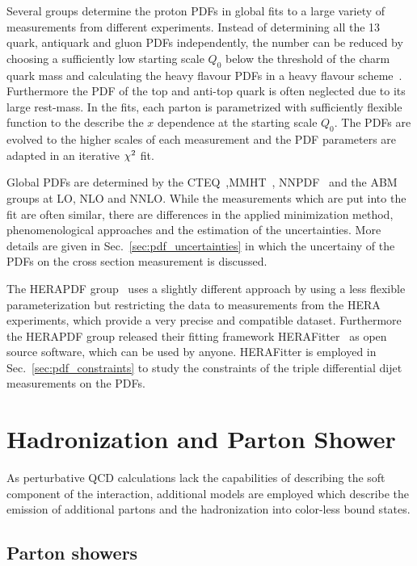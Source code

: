 Several groups determine the proton PDFs in global fits to a large variety of
measurements from different experiments. Instead of determining all the 13
quark, antiquark and gluon PDFs independently, the number can be reduced by
choosing a sufficiently low starting scale $Q_0$ below the threshold of the
charm quark mass and calculating the heavy flavour PDFs in a heavy flavour
scheme~\cite{rt_scheme}. Furthermore the PDF of the top and anti-top quark is
often neglected due to its large rest-mass. In the fits, each parton is
parametrized with sufficiently flexible function to the describe the $x$
dependence at the starting scale $Q_0$. The PDFs are evolved to the higher
scales of each measurement and the PDF parameters are adapted in an iterative
$\chi^2$ fit.

Global PDFs are determined by the
CTEQ~\cite{Dulat:2015mca},MMHT~\cite{Harland-Lang:2014zoa},
NNPDF~\cite{Ball:2014uwa} and the ABM~\cite{Alekhin:2013nda} groups at LO, NLO
and NNLO. While the measurements which are put into the fit are often similar,
there are differences in the applied minimization method, phenomenological
approaches and the estimation of the uncertainties. More details are given in
Sec.~\ref{sec:pdf_uncertainties} in which the uncertainy of the PDFs on the
cross section measurement is discussed.

The HERAPDF group~\cite{Abramowicz:2015mha} uses a slightly different approach
by using a less flexible parameterization but restricting the data to
measurements from the HERA experiments, which provide a very precise and
compatible dataset. Furthermore the HERAPDF group released their fitting
framework HERAFitter~\cite{Alekhin:2014irh} as open source software, which can
be used by anyone.  HERAFitter is employed in Sec.~\ref{sec:pdf_constraints} to
study the constraints of the triple differential dijet measurements on the PDFs.

\section{Hadronization and Parton Shower}

As perturbative QCD calculations lack the capabilities of describing the
soft component of the interaction, additional models are employed which describe
the emission of additional partons and the hadronization into color-less bound
states. 

\subsection{Parton showers}

